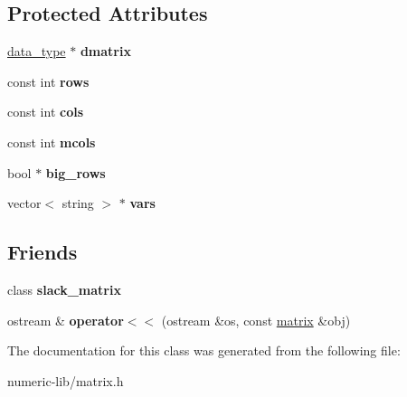 \subsection*{\-Protected \-Attributes}
\begin{DoxyCompactItemize}
\item 
\hypertarget{classmatrix_aef4166e34912a3aa6a3a094bc04e3c40}{\hyperlink{uniondata__type}{data\-\_\-type} $\ast$ {\bfseries dmatrix}}\label{classmatrix_aef4166e34912a3aa6a3a094bc04e3c40}

\item 
\hypertarget{classmatrix_a4b1510b3427815ae114b66d1bea22ca3}{const int {\bfseries rows}}\label{classmatrix_a4b1510b3427815ae114b66d1bea22ca3}

\item 
\hypertarget{classmatrix_a2a42ae1be2a3ba1224fb52ce611b0302}{const int {\bfseries cols}}\label{classmatrix_a2a42ae1be2a3ba1224fb52ce611b0302}

\item 
\hypertarget{classmatrix_a176a31f6dd3ed4b142665b2d2ac322ba}{const int {\bfseries mcols}}\label{classmatrix_a176a31f6dd3ed4b142665b2d2ac322ba}

\item 
\hypertarget{classmatrix_ae0a8f696146fca04ecce08c9c3262001}{bool $\ast$ {\bfseries big\-\_\-rows}}\label{classmatrix_ae0a8f696146fca04ecce08c9c3262001}

\item 
\hypertarget{classmatrix_ade936c553987bac183e839b36553d2ff}{vector$<$ string $>$ $\ast$ {\bfseries vars}}\label{classmatrix_ade936c553987bac183e839b36553d2ff}

\end{DoxyCompactItemize}
\subsection*{\-Friends}
\begin{DoxyCompactItemize}
\item 
\hypertarget{classmatrix_a719939672fd1aff22cf454d1d3468b00}{class {\bfseries slack\-\_\-matrix}}\label{classmatrix_a719939672fd1aff22cf454d1d3468b00}

\item 
\hypertarget{classmatrix_a50c021c146677e930106663ea7d32920}{ostream \& {\bfseries operator$<$$<$} (ostream \&os, const \hyperlink{classmatrix}{matrix} \&obj)}\label{classmatrix_a50c021c146677e930106663ea7d32920}

\end{DoxyCompactItemize}


\-The documentation for this class was generated from the following file\-:\begin{DoxyCompactItemize}
\item 
numeric-\/lib/matrix.\-h\end{DoxyCompactItemize}
